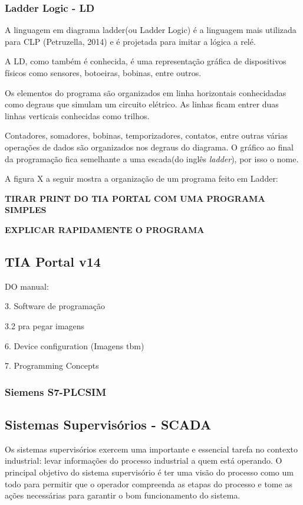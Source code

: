 \documentclass[a4paper, 12pt]{article}
\begin{document}
		\subsubsection{Ladder Logic - LD}
		
			A linguagem em diagrama ladder(ou Ladder Logic) é a linguagem mais utilizada para CLP (Petruzella, 2014)
			e é projetada para imitar a lógica a relé.
		
			A LD, como também é conhecida, é uma representação gráfica de dispositivos físicos
			como sensores, botoeiras, bobinas, entre outros.
			
			Os elementos do programa são organizados em linha horizontais conhecidadas como
			degraus que simulam um circuito elétrico. As linhas ficam entrer duas linhas
			verticais conhecidas como trilhos.
			
			Contadores, somadores, bobinas, temporizadores, contatos, entre outras várias
			operações de dados são organizados nos degraus do diagrama.
			O gráfico ao final da programação fica semelhante a uma escada(do inglês \textit{ladder}), por isso o nome.
			
			A figura X a seguir mostra a organização de um programa feito em Ladder:
			
			\textbf{TIRAR PRINT DO TIA PORTAL COM UMA PROGRAMA SIMPLES}
			
			\textbf{EXPLICAR RAPIDAMENTE O PROGRAMA}

	
	\subsection{TIA Portal v14}
	
		DO manual:
		
		3. Software de programação
		
		3.2 pra pegar imagens
		
		6. Device configuration (Imagens tbm)
		
		7. Programming Concepts
		
		\subsubsection{Siemens S7-PLCSIM}
	
	\subsection{Sistemas Supervisórios - SCADA}
		
		Os sistemas supervisórios exercem uma importante e essencial tarefa no contexto
		industrial: levar informações do processo industrial a quem está operando.
		O principal objetivo do sistema supervisório é ter uma visão do processo como um
		todo para permitir que o operador compreenda as etapas do processo e tome as ações
		necessárias para garantir o bom funcionamento do sistema.
		
\end{document}

